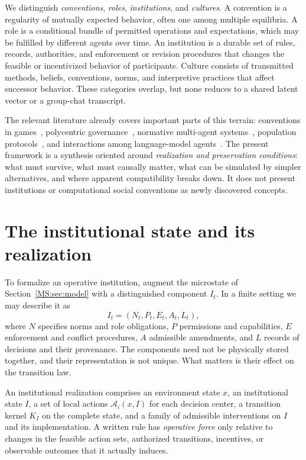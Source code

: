 We distinguish \emph{conventions}, \emph{roles}, \emph{institutions}, and \emph{cultures}. A convention is a regularity of mutually expected behavior, often one among multiple equilibria. A role is a conditional bundle of permitted operations and expectations, which may be fulfilled by different agents over time. An institution is a durable set of rules, records, authorities, and enforcement or revision procedures that changes the feasible or incentivized behavior of participants. Culture consists of transmitted methods, beliefs, conventions, norms, and interpretive practices that affect successor behavior. These categories overlap, but none reduces to a shared latent vector or a group-chat transcript.

The relevant literature already covers important parts of this terrain: conventions in games~\cite{MS:young,MS:shoham}, polycentric governance~\cite{MS:ostrom,MS:ostrombook}, normative multi-agent systems~\cite{MS:boella,MS:grossinorm}, population protocols~\cite{MS:angluin}, and interactions among language-model agents~\cite{MS:park,MS:ashery}. The present framework is a synthesis oriented around \emph{realization and preservation conditions}: what must survive, what must causally matter, what can be simulated by simpler alternatives, and where apparent compatibility breaks down. It does not present institutions or computational social conventions as newly discovered concepts.

\section{The institutional state and its realization}\label{MS:sec:institutional-state}

To formalize an operative institution, augment the microstate of Section~\ref{MS:sec:model} with a distinguished component $I_t$. In a finite setting we may describe it as
\begin{equation}\label{MS:eq:institutional-state}
I_t=(N_t,P_t,E_t,A_t,L_t),
\end{equation}
where $N$ specifies norms and role obligations, $P$ permissions and capabilities, $E$ enforcement and conflict procedures, $A$ admissible amendments, and $L$ records of decisions and their provenance. The components need not be physically stored together, and their representation is not unique. What matters is their effect on the transition law.

\begin{MSdefinition}\label{MS:def:institutional-realization}
An institutional realization comprises an environment state $x$, an institutional state $I$, a set of local actions $\mathcal A_i(x,I)$ for each decision center, a transition kernel $K_I$ on the complete state, and a family of admissible interventions on $I$ and its implementation. A written rule has \emph{operative force} only relative to changes in the feasible action sets, authorized transitions, incentives, or observable outcomes that it actually induces.
\end{MSdefinition}

